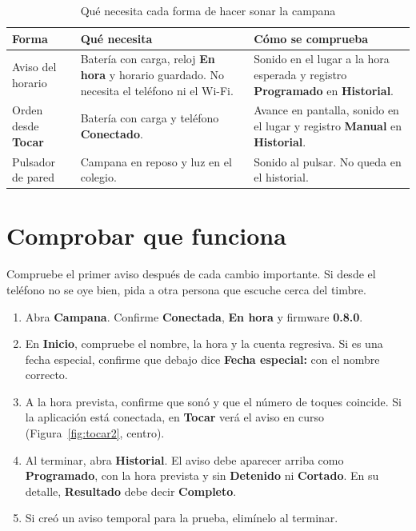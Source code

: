 \documentclass[a4paper,11pt]{article}
\begin{document}
\begin{table}[H]
\centering\small
\caption{Qué necesita cada forma de hacer sonar la campana}
\begin{tabularx}{\linewidth}{@{}P{3.6cm}YY@{}}
\toprule
\textbf{Forma} & \textbf{Qué necesita} & \textbf{Cómo se comprueba} \\
\midrule
Aviso del horario & Batería con carga, reloj \textbf{En hora} y horario guardado. No necesita el teléfono ni el Wi-Fi. & Sonido en el lugar a la hora esperada y registro \textbf{Programado} en \textbf{Historial}. \\
Orden desde \textbf{Tocar} & Batería con carga y teléfono \textbf{Conectado}. & Avance en pantalla, sonido en el lugar y registro \textbf{Manual} en \textbf{Historial}. \\
Pulsador de pared & Campana en reposo y luz en el colegio. & Sonido al pulsar. No queda en el historial. \\
\bottomrule
\end{tabularx}
\end{table}

\clearpage
\section{Comprobar que funciona}
\label{sec:prueba}
Compruebe el primer aviso después de cada cambio importante. Si desde el teléfono no se oye bien, pida a otra persona que escuche cerca del timbre.

\begin{enumerate}
  \item Abra \textbf{Campana}. Confirme \textbf{Conectada}, \textbf{En hora} y firmware \textbf{0.8.0}.
  \item En \textbf{Inicio}, compruebe el nombre, la hora y la cuenta regresiva. Si es una fecha especial, confirme que debajo dice \textbf{Fecha especial:} con el nombre correcto.
  \item A la hora prevista, confirme que sonó y que el número de toques coincide. Si la aplicación está conectada, en \textbf{Tocar} verá el aviso en curso (Figura~\ref{fig:tocar2}, centro).
  \item Al terminar, abra \textbf{Historial}. El aviso debe aparecer arriba como \textbf{Programado}, con la hora prevista y sin \textbf{Detenido} ni \textbf{Cortado}. En su detalle, \textbf{Resultado} debe decir \textbf{Completo}.
  \item Si creó un aviso temporal para la prueba, elimínelo al terminar.
\end{enumerate}
\end{document}
